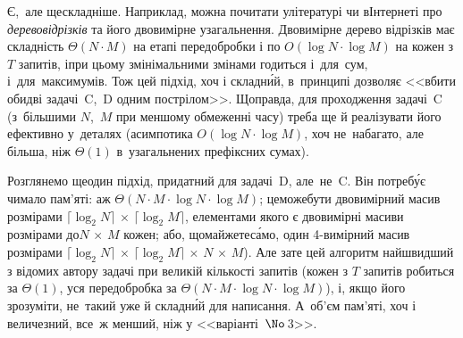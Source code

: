 Є,~але ще\nolinebreak[3] складніше. Наприклад, можна почитати у\nolinebreak[3] літературі чи в\nolinebreak[3] Інтернеті про \emph{дерево\nolinebreak[2] відрізків} та його двовимірне узагальнення. Двовимірне дерево відрізків має складність ${\Theta(N{\cdot}M)}$ на етапі передобробки і по $O(\log{N}{\cdot}\log{M})$ на кожен з $T$ запитів, і\nolinebreak[3] при цьому з\nolinebreak[3] мінімальними змінами годиться і~для~сум, і~для~максимумів. Тож цей підхід, хоч і складн\'{и}й, в~принципі дозволяє <<вбити обидві задачі~C,~D одним пострілом>>. Щоправда, для проходження задачі~C (з~більшими $N$,~$M$ при меншому обмеженні часу) треба ще й реалізувати його ефективно у~деталях (асимпотика $O(\log{N}{\cdot}\log{M})$, хоч не~набагато, але більша, ніж $\Theta(1)$ в~узагальнених префіксних сумах).

Розглянемо ще\nolinebreak[3] один підхід, придатний для задачі~D, але~не~C. Він потреб\'{у}є чимало пам'яті: аж ${\Theta(N{\cdot}M{\cdot}\log{N}{\cdot}\log{M})}$;
це\nolinebreak[3] може\nolinebreak[2] бути двовимірний масив розмірами ${\lceil\log_2{N}\rceil\,{\times}\,\lceil\log_2{M}\rceil}$, елементами якого є двовимірні масиви розмірами до\nolinebreak[3] ${N\,{\times}\,M}$ кожен; або, що\nolinebreak[2] майже\nolinebreak[2] те\nolinebreak[3] с\'{а}мо, один 
\mbox{4-вимір}\-ний 
масив розмірами ${\lceil\log_2{N}\rceil\,{\times}\,\lceil\log_2{M}\rceil\,{\times}\,N\,{\times}\,M}$).
Але зате цей алгоритм найшвидший з відомих автору задачі при великій кількості запитів (кожен з $T$ запитів робиться за $\Theta(1)$, уся передобробка за ${\Theta(N{\cdot}M{\cdot}\log{N}{\cdot}\log{M})}$), і, якщо його зрозуміти, не~такий уже й складн\'{и}й для написання. А~об'єм пам'яті, хоч і величезний, все~ж менший, ніж у <<варіанті~$\No\,$3>>.

